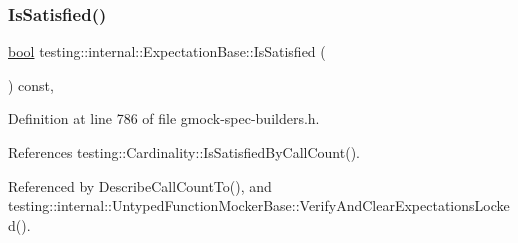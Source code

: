 \subsubsection{\texorpdfstring{Is\+Satisfied()}{IsSatisfied()}}
{\footnotesize\ttfamily \hyperlink{classbool}{bool} testing\+::internal\+::\+Expectation\+Base\+::\+Is\+Satisfied (\begin{DoxyParamCaption}{ }\end{DoxyParamCaption}) const\hspace{0.3cm}{\ttfamily [inline]}, {\ttfamily [protected]}}



Definition at line 786 of file gmock-\/spec-\/builders.\+h.



References testing\+::\+Cardinality\+::\+Is\+Satisfied\+By\+Call\+Count().



Referenced by Describe\+Call\+Count\+To(), and testing\+::internal\+::\+Untyped\+Function\+Mocker\+Base\+::\+Verify\+And\+Clear\+Expectations\+Locked().



